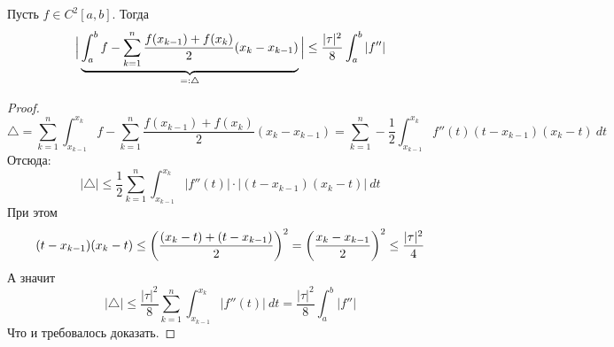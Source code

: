 \begin{theorem}
    Пусть $f \in C^2[a, b]$. Тогда
    \begin{equation*}
        \Big| \underbrace{\int_{a}^{b} f - \sum_{k = 1}^{n}
        \frac{f(x_{k - 1}) + f(x_k)}{2}(x_k - x_{k - 1})}_{\mathclap{=: \triangle}} \Big| \leq
        \frac{|\tau|^2}{8}\int_{a}^{b} |f''|
    \end{equation*}
\end{theorem}
\begin{proof}
    \begin{equation*}
            \triangle = \sum_{k = 1}^{n} \int_{{x_{k - 1}}}^{{x_k}} {f} -
            \sum_{k = 1}^{n} \frac{f(x_{k - 1}) + f(x_k)}{2}(x_k - x_{k - 1}) =
            \sum_{k = 1}^{n} - \frac{1}{2} \int_{{x_{k - 1}}}^{{x_k}} {f''(t)
            (t - x_{k - 1})(x_k - t)} \: d{t}
    \end{equation*}
    Отсюда:
    \begin{equation*}
            |\triangle| \leq \frac{1}{2} \sum_{k = 1}^{n}
            \int_{{x_{k - 1}}}^{{x_k}} {|f''(t)| \cdot |(t - x_{k - 1})(x_k - t)|} \: d{t}
    \end{equation*}
    При этом
    \begin{equation*}
            (t - x_{k - 1})(x_k - t) \leq \left(\frac{(x_k - t) + (t - x_{k - 1})}{2}\right)^2 =
            \left(\frac{x_k - x_{k - 1}}{2}\right)^2 \leq \frac{|\tau|^2}{4} \\
    \end{equation*}
    А значит
    \begin{equation*}
            |\triangle| \leq
            \frac{|\tau|^2}{8} \sum_{k = 1}^{n} \int_{x_{k - 1}}^{x_k}|f''(t)| \: dt =
            \frac{|\tau|^2}{8} \int_{a}^{b} |f''|
    \end{equation*}
    Что и требовалось доказать.
\end{proof}


